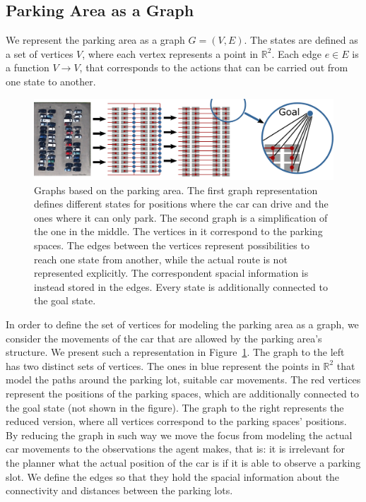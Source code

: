\subsection{Parking Area as a Graph} %
\label{sub:parking_area_as_a_graph_}

We represent the parking area as a graph $G = (V,E)$. The states are defined
as a set of vertices $V$, where each vertex represents a point in
$\mathbb{R}^2$. Each edge $e \in E$ is a function $V \rightarrow V$, that
corresponds to the actions that can be carried out from one state to another.

\begin{figure}[t]
    \begin{center}
        \includegraphics[width=\textwidth]{pictures/graph.pdf}
    \end{center}
    \caption{Graphs based on the parking area. The first graph representation defines different states for positions where the car can drive and the ones where it can only park.
    The second graph is a simplification of the one in the middle. The vertices in it correspond to the parking spaces. The edges between the vertices represent possibilities to reach one state from another, while the actual route is not represented explicitly. The correspondent spacial information is instead stored in the edges. Every state is additionally connected to the goal state.}
    \vspace{-5mm}
    \label{fig:graph}
\end{figure}


In order to define the set of vertices for modeling the parking area as a
graph, we consider the movements of the car that are allowed by the parking
area's structure. We present such a representation in Figure~\ref{fig:graph}.
The graph to the left has two distinct sets of vertices. The ones in blue
represent the points in $\mathbb{R}^2$ that model the paths around the parking
lot, suitable car movements. The red vertices represent the positions of the
parking spaces, which are additionally connected to the goal state (not shown
in the figure). The graph to the right represents the reduced version, where
all vertices correspond to the parking spaces' positions. By reducing the
graph in such way we move the focus from modeling the actual car movements to
the observations the agent makes, that is: it is irrelevant for the planner
what the actual position of the car is if it is able to observe a parking
slot. We define the edges so that they hold the spacial information about the
connectivity and distances between the parking lots.

